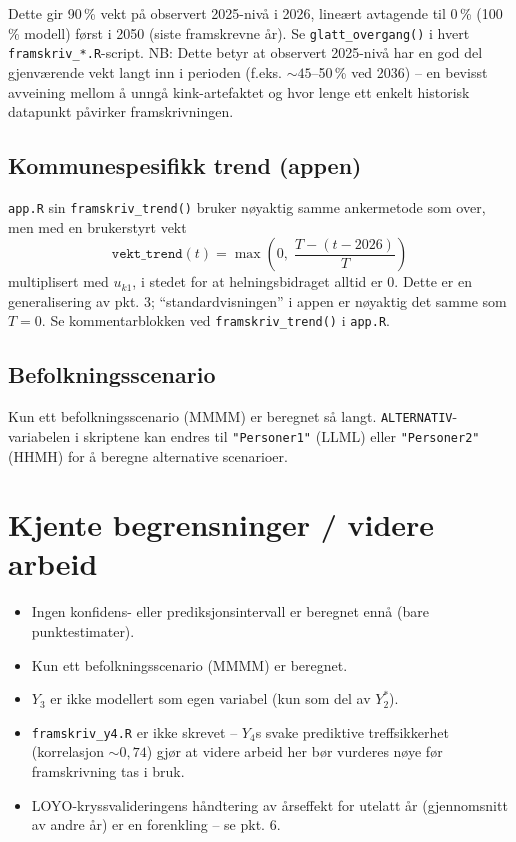 \documentclass[11pt,a4paper]{article}
\begin{document}
\begin{enumerate}[leftmargin=*,label=\arabic*.]
Dette gir 90\,\% vekt på observert 2025-nivå i 2026, lineært avtagende
til 0\,\% (100\,\% modell) først i 2050 (siste framskrevne år). Se
\texttt{glatt\_overgang()} i hvert \texttt{framskriv\_*.R}-script.
NB: Dette betyr at observert 2025-nivå har en god del gjenværende vekt
langt inn i perioden (f.eks. \(\sim 45\)--50\,\% ved 2036) -- en bevisst
avveining mellom å unngå kink-artefaktet og hvor lenge ett enkelt
historisk datapunkt påvirker framskrivningen.
\end{enumerate}

\subsection*{Kommunespesifikk trend (appen)}

\texttt{app.R} sin \texttt{framskriv\_trend()} bruker nøyaktig samme
ankermetode som over, men med en brukerstyrt vekt
\[
\texttt{vekt\_trend}(t)
=
\max\left(
0,\;
\frac{T-(t-2026)}{T}
\right)
\]
multiplisert med \(u_{k1}\), i stedet for at helningsbidraget alltid er 0.
Dette er en generalisering av pkt. 3; ``standardvisningen'' i appen er
nøyaktig det samme som \(T=0\). Se kommentarblokken ved
\texttt{framskriv\_trend()} i \texttt{app.R}.

\subsection*{Befolkningsscenario}

Kun ett befolkningsscenario (MMMM) er beregnet så langt.
\texttt{ALTERNATIV}-variabelen i skriptene kan endres til
\texttt{"Personer1"} (LLML) eller \texttt{"Personer2"} (HHMH) for å
beregne alternative scenarioer.

\section{Kjente begrensninger / videre arbeid}

\begin{itemize}[leftmargin=*]
\item Ingen konfidens- eller prediksjonsintervall er beregnet ennå
(bare punktestimater).
\item Kun ett befolkningsscenario (MMMM) er beregnet.
\item \(Y_3\) er ikke modellert som egen variabel (kun som del av
\(Y_2^\ast\)).
\item \texttt{framskriv\_y4.R} er ikke skrevet --
\(Y_4\)s svake prediktive treffsikkerhet (korrelasjon \(\sim 0{,}74\))
gjør at videre arbeid her bør vurderes nøye før framskrivning tas i bruk.
\item LOYO-kryssvalideringens håndtering av årseffekt for utelatt år
(gjennomsnitt av andre år) er en forenkling -- se pkt. 6.
\end{itemize}
\end{document}
